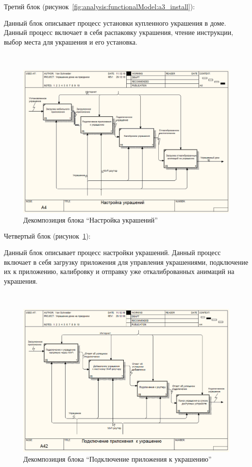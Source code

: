 Третий блок (рисунок~\ref{fig:analysis:functionalModel:a3_install}):

Данный блок описывает процесс установки купленного украшения в доме. Данный процесс включает в себя распаковку украшения, чтение инструкции, выбор места для украшения и его установка.

 ~
\begin{figure}[H]
\centering
	\includegraphics[scale=0.45]{figures/functionalModel/a4_settings.jpg}
	\caption{Декомпозиция блока ``Настройка украшений''}
	\label{fig:analysis:functionalModel:a4_settings}
\end{figure}

Четвертый блок (рисунок~\ref{fig:analysis:functionalModel:a4_settings}):

Данный блок описывает процесс настройки украшений. Данный процесс включает в себя загрузку приложения для управления украшениями, подключение их к приложению, калибровку и отправку уже откалиброванных анимаций на украшения. 

~
\begin{figure}[H]
\centering
	\includegraphics[scale=0.45]{figures/functionalModel/a42_connecting.jpg}
	\caption{Декомпозиция блока ``Подключение приложения к украшению''}
	\label{fig:analysis:functionalModel:a42_connecting}
\end{figure}

